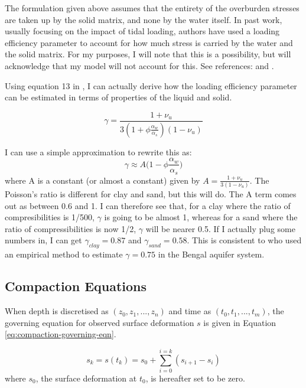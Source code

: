 \documentclass{article}
\begin{document}
The formulation given above assumes that the entirety of the overburden stresses are taken up by the solid matrix, and none by the water itself. In past work, usually focusing on the impact of tidal loading, authors have used a loading efficiency parameter to account for how much stress is carried by the water and the solid matrix. For my purposes, I will note that this is a possibility, but will acknowledge that my model will not account for this. See references: \cite{burgess_terrestrial_2017} and \cite{reeves_incorporation_2000}.

Using equation 13 in \cite{rojstaczer_influence_1989}, I can actually derive how the loading efficiency parameter can be estimated in terms of properties of the liquid and solid.

\begin{equation}
\label{eq:loading-efficiency}
\gamma = \frac{1 + \nu_u}{3 (1 + \phi \frac{\alpha_w}{\alpha_s}) (1 - \nu_u)}
\end{equation}

I can use a simple approximation to rewrite this as:
\begin{equation}
\label{eq:loading-efficiency-approx}
\gamma \approx A \bigg( 1 - \phi \frac{\alpha_w}{\alpha_s} \bigg)
\end{equation}
where A is a constant (or almost a constant) given by $A = \frac{1+\nu_u}{3(1-\nu_u)}$. The Poisson's ratio is different for clay and sand, but this will do. The A term comes out as between 0.6 and 1. I can therefore see that, for a clay where the ratio of compresibilities is 1/500, $\gamma$ is going to be almost 1, whereas for a sand where the ratio of compressibilities is now 1/2, $\gamma$ will be nearer 0.5. If I actually plug some numbers in, I can get $\gamma_{clay} = 0.87$ and $\gamma_{sand} = 0.58$. This is consistent to \cite{burgess_terrestrial_2017} who used an empirical method to estimate $\gamma = 0.75$ in the Bengal aquifer system. 

\subsection{Compaction Equations}

When depth is discretised as $(z_0, z_1, ..., z_n)$ and time as $(t_0, t_1, ..., t_m)$, the governing equation for observed surface deformation $s$ is given in Equation \ref{eq:compaction-governing-eqn}.

\begin{equation}
s_k = s(t_k) = s_0 + \sum_{i=0}^{i=k} (s_{i+1} - s_i)
\label{eq:compaction-governing-eqn}
\end{equation}
where $s_0$, the surface deformation at $t_0$, is hereafter set to be zero.
\end{document}
